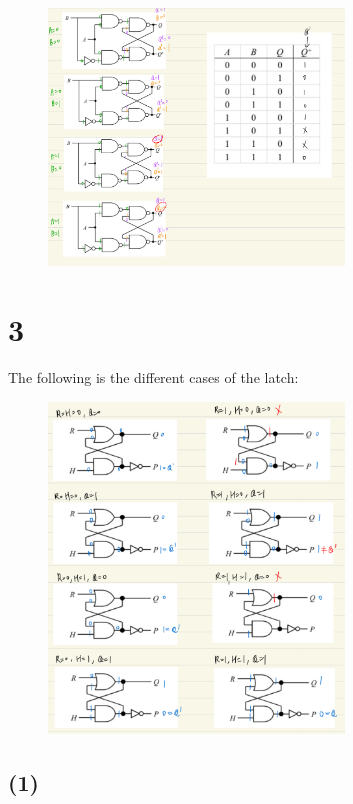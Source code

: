 \documentclass{article}
\begin{document}
\begin{figure}[h]
    \centering
    \includegraphics[width=0.7\textwidth]{2_derivation_and_sol.jpeg}
\end{figure}


\section*{3}

The following is the different cases of the latch:

\begin{figure}[H]
    \centering
    \includegraphics[width=0.7\textwidth]{3_derivation.jpeg}
\end{figure}

\subsection*{(1)}
\end{document}
